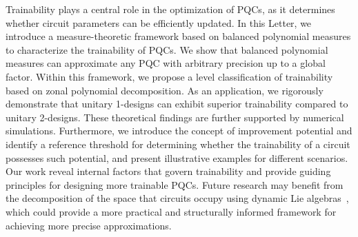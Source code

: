 \documentclass[%
 reprint,
 superscriptaddress,
 amsmath,amssymb,
 aps, prl, twocolumn, showpacs,
]{revtex4-2}
\begin{document}
Trainability plays a central role in the optimization of PQCs, as it determines whether circuit parameters can be efficiently updated. In this Letter, we introduce a measure-theoretic framework based on balanced polynomial measures to characterize the trainability of PQCs. We show that balanced polynomial measures can approximate any PQC with arbitrary precision up to a global factor. Within this framework, we propose a level classification of trainability based on zonal polynomial decomposition. As an application, we rigorously demonstrate that unitary 1-designs can exhibit superior trainability compared to unitary 2-designs. These theoretical findings are further supported by numerical simulations. Furthermore, we introduce the concept of improvement potential and identify a reference threshold for determining whether the trainability of a circuit possesses such potential, and present illustrative examples for different scenarios. Our work reveal internal factors that govern trainability and provide guiding principles for designing more trainable PQCs. Future research may benefit from the decomposition of the space that circuits occupy using dynamic Lie algebras~\cite{diaz2023showcasing, ragone2024lie}, which could provide a more practical and structurally informed framework for achieving more precise approximations.
\end{document}
